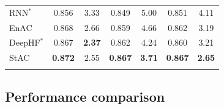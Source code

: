 \documentclass{bioinfo}
\begin{document}
\begin{table}[!tpb]
{\begin{tabular}{lcccccc}
        RNN$^*$ & 0.856 & 3.33 & 0.849 & 5.00 & 0.851 & 4.11 \\
        EnAC   & 0.868 & 2.66 & 0.859 & 4.66 & 0.862 & 3.19 \\
        DeepHF$^*$ & 0.867 & \textbf{2.37} & 0.862 & 4.24 & 0.860 & 3.21 \\
        StAC   & \textbf{0.872} & 2.55 & \textbf{0.867} & \textbf{3.71} & \textbf{0.867} & \textbf{2.65} \\
     \botrule
\end{tabular}}\footnotesize{}
\end{table}

\subsection{Performance comparison}\label{section:comparison}
\end{document}
